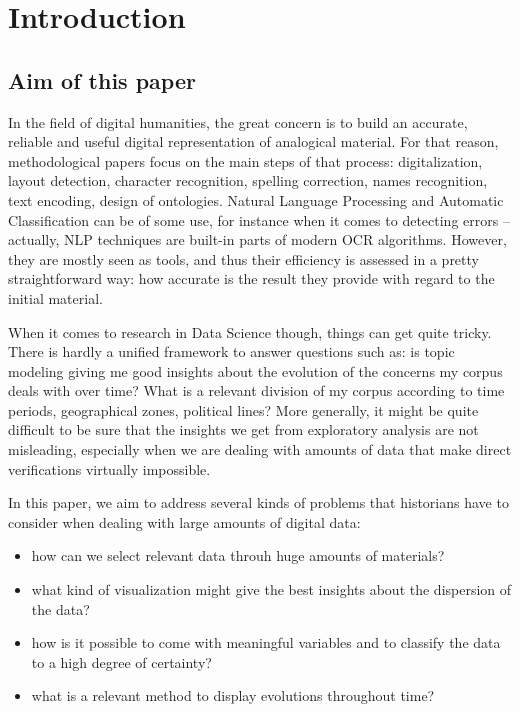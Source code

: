 \documentclass[a4paper,11pt]{article}
\begin{document}
\section{Introduction}

\subsection{Aim of this paper}

In the field of digital humanities, the great concern is to build an accurate, reliable and useful digital representation of analogical material. For that reason, methodological papers focus on the main steps of that process: digitalization, layout detection, character recognition, spelling correction, names recognition, text encoding, design of ontologies. Natural Language Processing and Automatic Classification can be of some use, for instance when it comes to detecting errors -- actually, NLP techniques are built-in parts of modern OCR algorithms. However, they are mostly seen as tools, and thus their efficiency is assessed in a pretty straightforward way: how accurate is the result they provide with regard to the initial material.

When it comes to research in Data Science though, things can get quite tricky. There is hardly a unified framework to answer questions such as: is topic modeling giving me good insights about the evolution of the concerns my corpus deals with over time? What is a relevant division of my corpus according to time periods, geographical zones, political lines? More generally, it might be quite difficult to be sure that the insights we get from exploratory analysis are not misleading, especially when we are dealing with amounts of data that make direct verifications virtually impossible.

In this paper, we aim to address several kinds of problems that historians have to consider  when dealing with large amounts of digital data:
\begin{itemize}
	\item how can we select relevant data throuh huge amounts of materials?
	\item what kind of visualization might give the best insights about the dispersion of the data?
	\item how is it possible to come with meaningful variables and to classify the data to a high degree of certainty?
	\item what is a relevant method to display evolutions throughout time?
\end{itemize}
\end{document}
